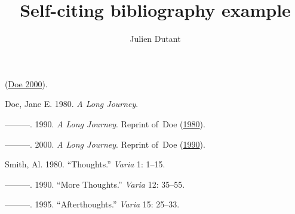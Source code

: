\documentclass[
]{article}
\title{Self-citing bibliography example}
\author{Julien Dutant}
\date{}
\newlength{\cslhangindent}
\newlength{\cslentryspacingunit} %
\newenvironment{CSLReferences}[2] %
 {%
  \setlength{\parindent}{0pt}
  \ifodd #1
  \let\oldpar\par
  \def\par{\hangindent=\cslhangindent\oldpar}
  \fi
  \setlength{\parskip}{#2\cslentryspacingunit}
 }%
 {}
\begin{document}
\maketitle

(\protect\hyperlink{ref-Doe2000}{Doe 2000}).

\hypertarget{refs}{}
\begin{CSLReferences}{1}{0}
\leavevmode{}%
Doe, Jane E. 1980. \emph{A Long Journey}.

\leavevmode{}%
---------. 1990. \emph{A Long Journey}. Reprint of~Doe
(\protect\hyperlink{ref-Doe1980}{1980}).

\leavevmode{}%
---------. 2000. \emph{A Long Journey}. Reprint of~Doe
(\protect\hyperlink{ref-Doe1990}{1990}).

\leavevmode{}%
Smith, Al. 1980. {``Thoughts.''} \emph{Varia} 1: 1--15.

\leavevmode{}%
---------. 1990. {``More Thoughts.''} \emph{Varia} 12: 35--55.

\leavevmode{}%
---------. 1995. {``Afterthoughts.''} \emph{Varia} 15: 25--33.

\end{CSLReferences}
\end{document}
